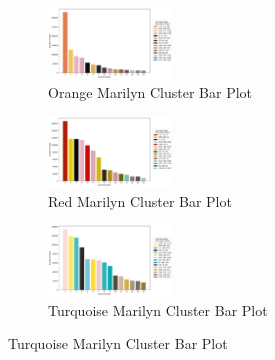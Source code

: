 \documentclass{article}
\begin{document}
\begin{figure}[ht]
  \centering
  \begin{subfigure}{0.3\textwidth}
    \centering
    \includegraphics[width=125px]{main_files/figure-latex/6_1_orange_marilyn_cluster_bar_chart.pdf}
    \caption{Orange Marilyn Cluster Bar Plot}
    \label{fig:6_1_orange_marilyn_cluster_bar_chart}
  \end{subfigure}
  \hfill
  \begin{subfigure}{0.3\textwidth}
    \centering
    \includegraphics[width=125px]{main_files/figure-latex/6_2_red_marilyn_cluster_bar_chart.pdf}
    \caption{Red Marilyn Cluster Bar Plot}
    \label{fig:6_2_red_marilyn_cluster_bar_chart}
  \end{subfigure}
  \hfill
  \begin{subfigure}{0.3\textwidth}
    \centering
    \includegraphics[width=125px]{main_files/figure-latex/6_3_turq_marilyn_cluster_bar_chart.pdf}
    \caption{Turquoise Marilyn Cluster Bar Plot}
    \label{fig:6_3_turq_marilyn_cluster_bar_chart}
  \end{subfigure}

  \vspace{1em}


\end{figure}
\end{document}
